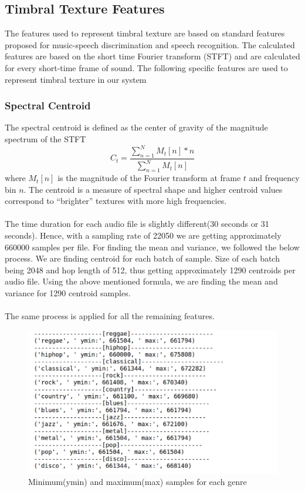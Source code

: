 \documentclass[a4paper,10pt]{article}
\begin{document}
\subsection{Timbral Texture Features} 
The features used to represent timbral texture are based on standard features proposed for music-speech discrimination and speech recognition. The calculated features are based on the short time Fourier transform (STFT) and are calculated for every short-time frame of sound.  The following specific features are used to represent timbral texture in our system

\subsubsection{Spectral Centroid}
The spectral centroid is defined as the center of gravity of the magnitude spectrum of the STFT
$$C_{t} = \frac{\sum_{n=1}^{N}M_{t}[n]*n}{\sum_{n=1}^{N}M_{t}[n]}$$
where $M_{t}[n]$ is the magnitude of the Fourier transform at frame $t$ and frequency bin $n$. The centroid is a measure of spectral shape and higher centroid values correspond to “brighter” textures with more high frequencies.
\\
\\
The time duration for each audio file is slightly different(30 seconds or 31 seconds).  Hence, with a sampling rate of 22050 we are getting approximately 660000 samples per file.  
 For finding the mean and variance, we followed the below process. We are finding centroid for each batch of sample.  Size of each batch being 2048 and hop length of 512, thus getting approximately 1290 centroids per audio file.
Using the above mentioned formula, we are finding the mean and variance for 1290 centroid samples.\\ \\
The same process is applied for all the remaining features.

\begin{center}
\begin{figure}

  \includegraphics{audiosample.png}
  \caption{Minimum(ymin) and maximum(max) samples for each genre}
  \label{fig:audiosamples}
\end{figure}

\end{center}
\end{document}
